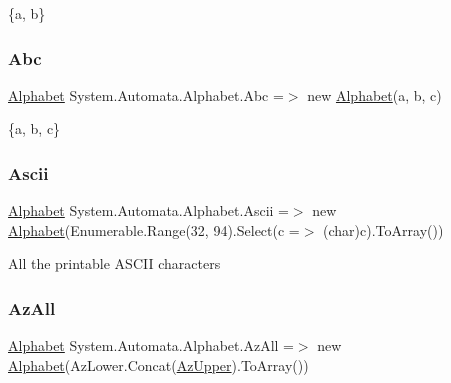 \{a, b\} 

\mbox{\label{class_system_1_1_automata_1_1_alphabet_a2c79b315618446cdd7ba875a7924d83f}} 
\subsubsection{\texorpdfstring{Abc}{Abc}}
{\footnotesize\ttfamily \mbox{\hyperlink{class_system_1_1_automata_1_1_alphabet}{Alphabet}} System.\+Automata.\+Alphabet.\+Abc =$>$ new \mbox{\hyperlink{class_system_1_1_automata_1_1_alphabet}{Alphabet}}(\textquotesingle{}a\textquotesingle{}, \textquotesingle{}b\textquotesingle{}, \textquotesingle{}c\textquotesingle{})\hspace{0.3cm}{\ttfamily [static]}}



\{a, b, c\} 

\mbox{\label{class_system_1_1_automata_1_1_alphabet_a8876c9767b18e483848a0f4bc4de2cef}} 
\subsubsection{\texorpdfstring{Ascii}{Ascii}}
{\footnotesize\ttfamily \mbox{\hyperlink{class_system_1_1_automata_1_1_alphabet}{Alphabet}} System.\+Automata.\+Alphabet.\+Ascii =$>$ new \mbox{\hyperlink{class_system_1_1_automata_1_1_alphabet}{Alphabet}}(Enumerable.\+Range(32, 94).Select(c =$>$ (char)c).To\+Array())\hspace{0.3cm}{\ttfamily [static]}}



All the printable A\+S\+C\+II characters 

\mbox{\label{class_system_1_1_automata_1_1_alphabet_a090b19b9683fc56693e032edf961313f}} 
\subsubsection{\texorpdfstring{Az\+All}{AzAll}}
{\footnotesize\ttfamily \mbox{\hyperlink{class_system_1_1_automata_1_1_alphabet}{Alphabet}} System.\+Automata.\+Alphabet.\+Az\+All =$>$ new \mbox{\hyperlink{class_system_1_1_automata_1_1_alphabet}{Alphabet}}(Az\+Lower.\+Concat(\mbox{\hyperlink{class_system_1_1_automata_1_1_alphabet_ac1b4eaec3c00e63dab2d176773ec84f1}{Az\+Upper}}).To\+Array())\hspace{0.3cm}{\ttfamily [static]}}



